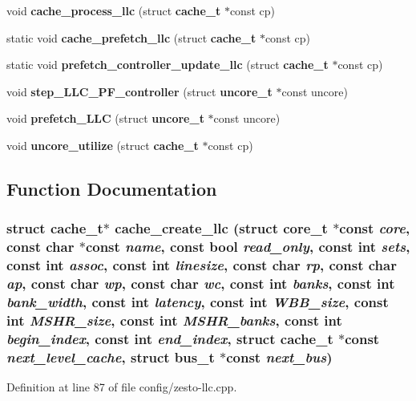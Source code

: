 \begin{CompactItemize}
\item 
void {\bf cache\_\-process\_\-llc} (struct {\bf cache\_\-t} $\ast$const cp)
\item 
static void {\bf cache\_\-prefetch\_\-llc} (struct {\bf cache\_\-t} $\ast$const cp)
\item 
static void {\bf prefetch\_\-controller\_\-update\_\-llc} (struct {\bf cache\_\-t} $\ast$const cp)
\item 
void {\bf step\_\-LLC\_\-PF\_\-controller} (struct {\bf uncore\_\-t} $\ast$const uncore)
\item 
void {\bf prefetch\_\-LLC} (struct {\bf uncore\_\-t} $\ast$const uncore)
\item 
void {\bf uncore\_\-utilize} (struct {\bf cache\_\-t} $\ast$const cp)
\end{CompactItemize}


\subsection{Function Documentation}
\subsubsection[{cache\_\-create\_\-llc}]{\setlength{\rightskip}{0pt plus 5cm}struct {\bf cache\_\-t}$\ast$ cache\_\-create\_\-llc (struct {\bf core\_\-t} $\ast$const  {\em core}, \/  const char $\ast$const  {\em name}, \/  const bool {\em read\_\-only}, \/  const int {\em sets}, \/  const int {\em assoc}, \/  const int {\em linesize}, \/  const char {\em rp}, \/  const char {\em ap}, \/  const char {\em wp}, \/  const char {\em wc}, \/  const int {\em banks}, \/  const int {\em bank\_\-width}, \/  const int {\em latency}, \/  const int {\em WBB\_\-size}, \/  const int {\em MSHR\_\-size}, \/  const int {\em MSHR\_\-banks}, \/  const int {\em begin\_\-index}, \/  const int {\em end\_\-index}, \/  struct {\bf cache\_\-t} $\ast$const  {\em next\_\-level\_\-cache}, \/  struct {\bf bus\_\-t} $\ast$const  {\em next\_\-bus})\hspace{0.3cm}{\tt  [read]}}\label{config_2zesto-llc_8cpp_727c4cbf039edb120fe825803e69067f}




Definition at line 87 of file config/zesto-llc.cpp.
